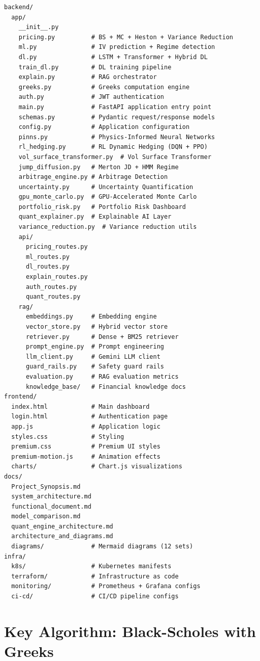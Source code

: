 \documentclass[12pt,a4paper]{report}
\begin{document}
\begin{lstlisting}[style=pythonstyle, caption={Repository Structure}, label={lst:repo-structure}, language={}]
backend/
  app/
    __init__.py
    pricing.py          # BS + MC + Heston + Variance Reduction
    ml.py               # IV prediction + Regime detection
    dl.py               # LSTM + Transformer + Hybrid DL
    train_dl.py         # DL training pipeline
    explain.py          # RAG orchestrator
    greeks.py           # Greeks computation engine
    auth.py             # JWT authentication
    main.py             # FastAPI application entry point
    schemas.py          # Pydantic request/response models
    config.py           # Application configuration
    pinns.py            # Physics-Informed Neural Networks
    rl_hedging.py       # RL Dynamic Hedging (DQN + PPO)
    vol_surface_transformer.py  # Vol Surface Transformer
    jump_diffusion.py   # Merton JD + HMM Regime
    arbitrage_engine.py # Arbitrage Detection
    uncertainty.py      # Uncertainty Quantification
    gpu_monte_carlo.py  # GPU-Accelerated Monte Carlo
    portfolio_risk.py   # Portfolio Risk Dashboard
    quant_explainer.py  # Explainable AI Layer
    variance_reduction.py  # Variance reduction utils
    api/
      pricing_routes.py
      ml_routes.py
      dl_routes.py
      explain_routes.py
      auth_routes.py
      quant_routes.py
    rag/
      embeddings.py     # Embedding engine
      vector_store.py   # Hybrid vector store
      retriever.py      # Dense + BM25 retriever
      prompt_engine.py  # Prompt engineering
      llm_client.py     # Gemini LLM client
      guard_rails.py    # Safety guard rails
      evaluation.py     # RAG evaluation metrics
      knowledge_base/   # Financial knowledge docs
frontend/
  index.html            # Main dashboard
  login.html            # Authentication page
  app.js                # Application logic
  styles.css            # Styling
  premium.css           # Premium UI styles
  premium-motion.js     # Animation effects
  charts/               # Chart.js visualizations
docs/
  Project_Synopsis.md
  system_architecture.md
  functional_document.md
  model_comparison.md
  quant_engine_architecture.md
  architecture_and_diagrams.md
  diagrams/             # Mermaid diagrams (12 sets)
infra/
  k8s/                  # Kubernetes manifests
  terraform/            # Infrastructure as code
  monitoring/           # Prometheus + Grafana configs
  ci-cd/                # CI/CD pipeline configs
\end{lstlisting}

\section{Key Algorithm: Black-Scholes with Greeks}
\end{document}
